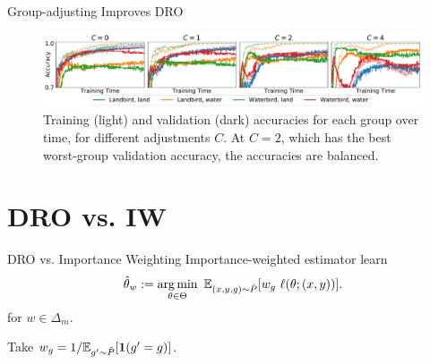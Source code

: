 \documentclass{beamer}
\begin{document}
\begin{viterbiframe}{Group-adjusting Improves DRO}
    \begin{figure}
      \includegraphics[width=\textwidth]{img/group_adj_waterbirds.pdf}
      \caption{
        Training (light) and validation (dark) accuracies for each group over time,
        for different adjustments $C$.
        At $C=2$, which has the best worst-group validation accuracy, the accuracies are balanced.
    }
    \label{fig:adj}
    \end{figure}

\end{viterbiframe}

\section{DRO vs. IW}

\begin{viterbiframe}{DRO vs. Importance Weighting}
    Importance-weighted estimator learn
    \begin{align}
      {\hat\theta_{w}} := \operatorname*{arg\,min}_{\theta \in \Theta} \ \mathbb{E}_{(x,y,g) \sim {\hat{P}}}[w_g \ \ell(\theta; (x, y))].
    \end{align}
    for $w \in \Delta_m$.

    \pause
    Take $w_g = 1 / \mathbb{E}_{g^\prime \sim {\hat{P}}} [\bm{1}(g^\prime = g)]$.
\end{viterbiframe}
    
\end{document}
